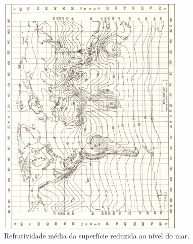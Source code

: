 \begin{table}[h]
\centering
\caption[Refratividade da superfície em função do clima da região.]
{Refratividade da superfície em função do clima da região.}
\label{table:climatetable}
\end{table}

\begin{figure}[nsmap]
\centering
\includegraphics[width=0.8\textwidth]{figs/nsmap}
\caption[Refratividade média da superfície reduzida ao nível do mar.]
{Refratividade média da superfície reduzida ao nível do mar.~\cite{longleyrice}}
\label{fig:nsmap}
\end{figure}

